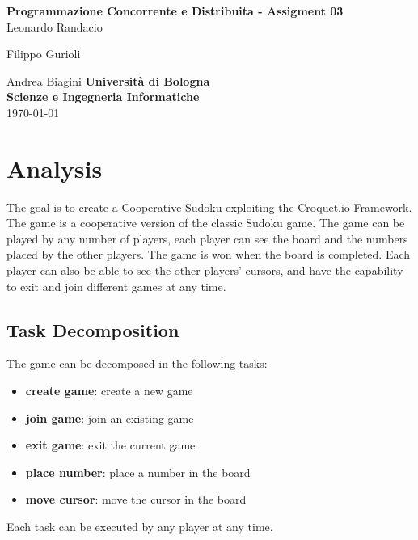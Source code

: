 \documentclass[12pt, a4paper]{report}
\begin{document}
\renewcommand\bibname{References} %


\begin{titlepage}

\begin{center}

\Large \textbf {Programmazione Concorrente e Distribuita - Assigment 03}\\%
\vspace{1em}%
\vfill
Leonardo Randacio


Filippo Gurioli


Andrea Biagini
\vspace{1em}
\vfill
{\bf Università di Bologna \\ Scienze e Ingegneria Informatiche}\\[0.5in]

       
\vfill
\today

\end{center}

\end{titlepage}


\tableofcontents
\listoffigures
\listoftables

\newpage
{} %

\chapter{Analysis}
The goal is to create a Cooperative Sudoku exploiting the Croquet.io Framework.
%
The game is a cooperative version of the classic Sudoku game. The game can be played by any number of players, each player can see the board and the numbers placed by the other players. The game is won when the board is completed.
Each player can also be able to see the other players' cursors, and have the capability to exit and join different games at any time.

\section{Task Decomposition}
The game can be decomposed in the following tasks:
\begin{itemize}
    \item \textbf{create game}: create a new game
    \item \textbf{join game}: join an existing game
    \item \textbf{exit game}: exit the current game
    \item \textbf{place number}: place a number in the board
    \item \textbf{move cursor}: move the cursor in the board
\end{itemize}
Each task can be executed by any player at any time.
\end{document}
